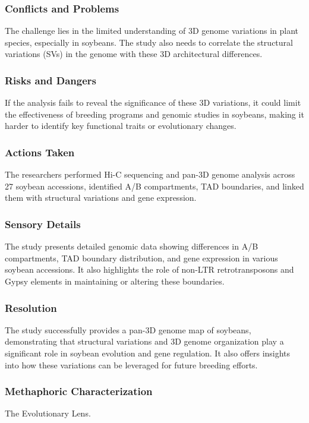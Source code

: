 \subsubsection{Conflicts and Problems}
The challenge lies in the limited understanding of 3D genome variations in plant species, especially in soybeans. The study also needs to correlate the structural variations (SVs) in the genome with these 3D architectural differences.

\subsubsection{Risks and Dangers}
If the analysis fails to reveal the significance of these 3D variations, it could limit the effectiveness of breeding programs and genomic studies in soybeans, making it harder to identify key functional traits or evolutionary changes.

\subsubsection{Actions Taken}
The researchers performed Hi-C sequencing and pan-3D genome analysis across 27 soybean accessions, identified A/B compartments, TAD boundaries, and linked them with structural variations and gene expression.

\subsubsection{Sensory Details}
The study presents detailed genomic data showing differences in A/B compartments, TAD boundary distribution, and gene expression in various soybean accessions. It also highlights the role of non-LTR retrotransposons and Gypsy elements in maintaining or altering these boundaries.

\subsubsection{Resolution}
The study successfully provides a pan-3D genome map of soybeans, demonstrating that structural variations and 3D genome organization play a significant role in soybean evolution and gene regulation. It also offers insights into how these variations can be leveraged for future breeding efforts.

\subsubsection{Methaphoric Characterization}
The Evolutionary Lens.

